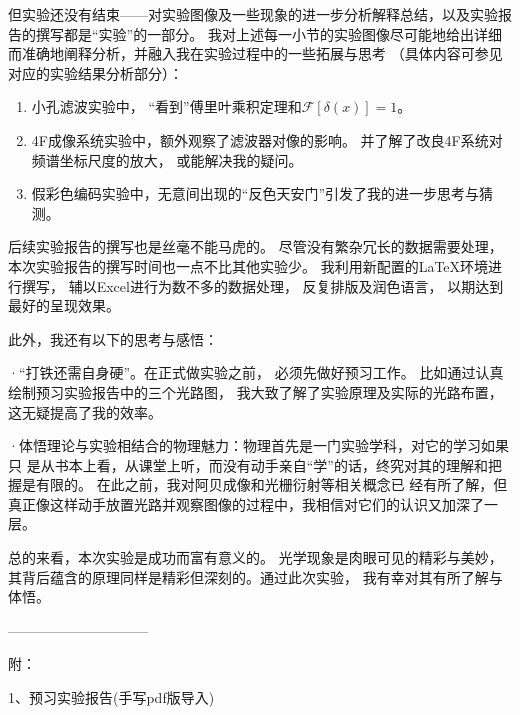 \documentclass[11pt]{article}
\begin{document}
但实验还没有结束——对实验图像及一些现象的进一步分析解释总结，以及实验报告的撰写都是“实验”的一部分。
我对上述每一小节的实验图像尽可能地给出详细而准确地阐释分析，并融入我在实验过程中的一些拓展与思考
（具体内容可参见对应的实验结果分析部分）：

\begin{enumerate}
    \item 小孔滤波实验中，
“看到”傅里叶乘积定理和$\mathcal F[\delta (x)]=1$。

\item 4F成像系统实验中，额外观察了滤波器对像的影响。
并了解了改良4F系统对频谱坐标尺度的放大，
或能解决我的疑问。

\item 假彩色编码实验中，无意间出现的“反色天安门”引发了我的进一步思考与猜测。

\end{enumerate}

后续实验报告的撰写也是丝毫不能马虎的。
尽管没有繁杂冗长的数据需要处理，
本次实验报告的撰写时间也一点不比其他实验少。
我利用新配置的\LaTeX 环境进行撰写，
辅以Excel进行为数不多的数据处理，
反复排版及润色语言，
以期达到最好的呈现效果。

此外，我还有以下的思考与感悟：

·“打铁还需自身硬”。在正式做实验之前，
必须先做好预习工作。
比如通过认真绘制预习实验报告中的三个光路图，
我大致了解了实验原理及实际的光路布置，这无疑提高了我的效率。

·体悟理论与实验相结合的物理魅力：物理首先是一门实验学科，对它的学习如果只
是从书本上看，从课堂上听，而没有动手亲自“学”的话，终究对其的理解和把握是有限的。
在此之前，我对阿贝成像和光栅衍射等相关概念已
经有所了解，但真正像这样动手放置光路并观察图像的过程中，我相信对它们的认识又加深了一层。

总的来看，本次实验是成功而富有意义的。
光学现象是肉眼可见的精彩与美妙，
其背后蕴含的原理同样是精彩但深刻的。通过此次实验，
我有幸对其有所了解与体悟。


\bigskip
——————————

附：

1、预习实验报告(手写pdf版导入)


\newpage


\end{document}
